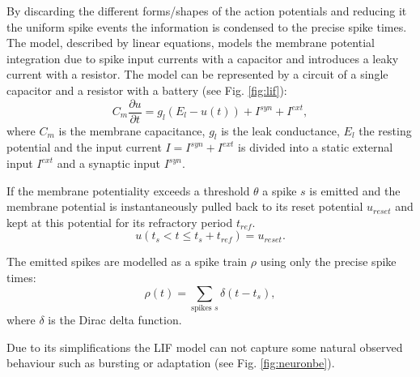 By discarding the different forms/shapes of the action potentials and reducing it the uniform spike events the information is condensed to the precise spike times.
The model, described by linear equations, models the membrane potential integration due to spike input currents with a capacitor and introduces a leaky current with a resistor. 
The model can be represented by a circuit of a single capacitor and a resistor with a battery (see Fig. \ref{fig:lif}):
\[
C_m \frac{\partial u}{\partial t} = g_l ( E_l - u(t) ) + I^{syn} + I^{ext} , 
\]
where $C_m$ is the membrane capacitance, $g_l$ is the leak conductance, $E_l$ the resting potential and the input current $I = I^{syn} + I^{ext}$ is divided into a static external input $I^{ext}$ and a synaptic input $I^{syn}$.   

If the membrane potentiality exceeds a threshold $\theta$ a spike $s$ is emitted and the membrane potential is instantaneously pulled back to its reset potential $u_{reset}$ and kept at this potential for its refractory period $t_{ref}$.
\[
u(t_{s} < t \le t_{s} + t_{ref}) = u_{reset}.
\]

The emitted spikes are modelled as a spike train $\rho$ using only the precise spike times:
\[
\rho(t) = \sum_{\text{spikes } s} \delta(t-t_s),
\] 
where $\delta$ is the Dirac delta function.

Due to its simplifications the LIF model can not capture some natural observed behaviour such as bursting or adaptation (see Fig. \ref{fig:neuronbe}). 

